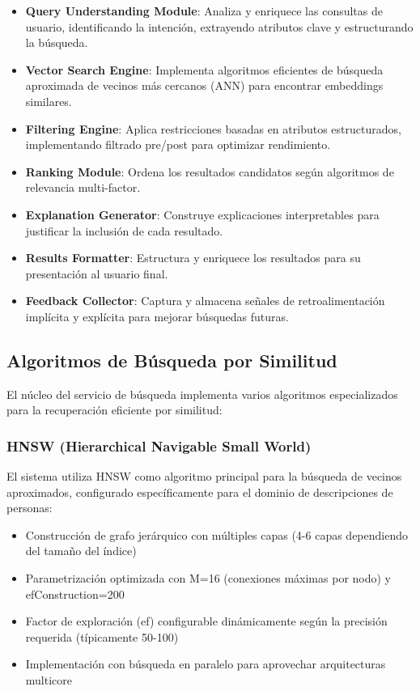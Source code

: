 \documentclass[12pt,a4paper]{article}
\begin{document}
\begin{itemize}
    \item \textbf{Query Understanding Module}: Analiza y enriquece las consultas de usuario, identificando la intención, extrayendo atributos clave y estructurando la búsqueda.
    
    \item \textbf{Vector Search Engine}: Implementa algoritmos eficientes de búsqueda aproximada de vecinos más cercanos (ANN) para encontrar embeddings similares.
    
    \item \textbf{Filtering Engine}: Aplica restricciones basadas en atributos estructurados, implementando filtrado pre/post para optimizar rendimiento.
    
    \item \textbf{Ranking Module}: Ordena los resultados candidatos según algoritmos de relevancia multi-factor.
    
    \item \textbf{Explanation Generator}: Construye explicaciones interpretables para justificar la inclusión de cada resultado.
    
    \item \textbf{Results Formatter}: Estructura y enriquece los resultados para su presentación al usuario final.
    
    \item \textbf{Feedback Collector}: Captura y almacena señales de retroalimentación implícita y explícita para mejorar búsquedas futuras.
\end{itemize}

\subsection{Algoritmos de Búsqueda por Similitud}
\label{subsec:ss-algoritmos}

El núcleo del servicio de búsqueda implementa varios algoritmos especializados para la recuperación eficiente por similitud:

\subsubsection{HNSW (Hierarchical Navigable Small World)}
El sistema utiliza HNSW como algoritmo principal para la búsqueda de vecinos aproximados, configurado específicamente para el dominio de descripciones de personas:

\begin{itemize}
    \item Construcción de grafo jerárquico con múltiples capas (4-6 capas dependiendo del tamaño del índice)
    \item Parametrización optimizada con M=16 (conexiones máximas por nodo) y efConstruction=200
    \item Factor de exploración (ef) configurable dinámicamente según la precisión requerida (típicamente 50-100)
    \item Implementación con búsqueda en paralelo para aprovechar arquitecturas multicore
\end{itemize}
\end{document}
